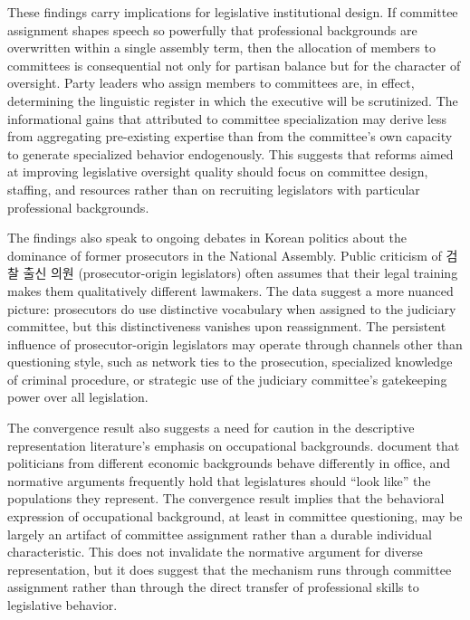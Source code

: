 \documentclass[11pt]{article}
\begin{document}
These findings carry implications for legislative institutional design. If committee assignment shapes speech so powerfully that professional backgrounds are overwritten within a single assembly term, then the allocation of members to committees is consequential not only for partisan balance but for the character of oversight. Party leaders who assign members to committees are, in effect, determining the linguistic register in which the executive will be scrutinized. The informational gains that \citet{krehbiel1991} attributed to committee specialization may derive less from aggregating pre-existing expertise than from the committee's own capacity to generate specialized behavior endogenously. This suggests that reforms aimed at improving legislative oversight quality should focus on committee design, staffing, and resources rather than on recruiting legislators with particular professional backgrounds.

The findings also speak to ongoing debates in Korean politics about the dominance of former prosecutors in the National Assembly. Public criticism of 검찰 출신 의원 (prosecutor-origin legislators) often assumes that their legal training makes them qualitatively different lawmakers. The data suggest a more nuanced picture: prosecutors do use distinctive vocabulary when assigned to the judiciary committee, but this distinctiveness vanishes upon reassignment. The persistent influence of prosecutor-origin legislators may operate through channels other than questioning style, such as network ties to the prosecution, specialized knowledge of criminal procedure, or strategic use of the judiciary committee's gatekeeping power over all legislation.

The convergence result also suggests a need for caution in the descriptive representation literature's emphasis on occupational backgrounds. \citet{carnes2023} document that politicians from different economic backgrounds behave differently in office, and normative arguments frequently hold that legislatures should ``look like'' the populations they represent. The convergence result implies that the behavioral expression of occupational background, at least in committee questioning, may be largely an artifact of committee assignment rather than a durable individual characteristic. This does not invalidate the normative argument for diverse representation, but it does suggest that the mechanism runs through committee assignment rather than through the direct transfer of professional skills to legislative behavior.
\end{document}
